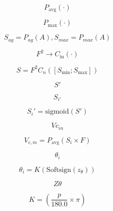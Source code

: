 \documentclass[journal]{IEEEtran}
\begin{document}
\begin{equation}
P_{\text{avg}}(\cdot)
\label{eq:eq_8}
\end{equation}

\begin{equation}
P_{\text{max}}(\cdot)
\label{eq:eq_9}
\end{equation}

\begin{equation}
S_{ag} = P_{ag}(A), S_{max} = P_{max}(A)
\label{eq:eq_10}
\end{equation}

\begin{equation}
F^2 \to C_{\text{in}} (\cdot)
\label{eq:eq_11}
\end{equation}

\begin{equation}
S = F^2 C_n \left( \left[ S_{\text{min}} ; S_{\text{max}} \right] \right)
\label{eq:eq_12}
\end{equation}

\begin{equation}
S'
\label{eq:eq_13}
\end{equation}

\begin{equation}
S_{i'}
\label{eq:eq_14}
\end{equation}

\begin{equation}
S_i' = \text{sigmoid}(S')
\label{eq:eq_15}
\end{equation}

\begin{equation}
V c_{in}
\label{eq:eq_16}
\end{equation}

\begin{equation}
V_{c,\dot{m}} = P_{\text{avg}} (S_i \times F)
\label{eq:eq_17}
\end{equation}

\begin{equation}
\theta_i
\label{eq:eq_18}
\end{equation}

\begin{equation}
\theta_i = K(\text{Softsign}(z_\theta))
\label{eq:eq_19}
\end{equation}

\begin{equation}
Z \theta
\label{eq:eq_20}
\end{equation}

\begin{equation}
K = \left( \frac{p}{180.0} \times \pi \right)
\label{eq:eq_21}
\end{equation}
\end{document}
